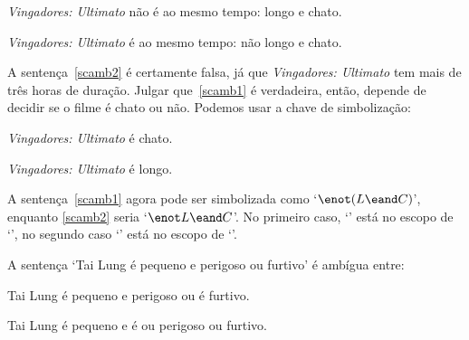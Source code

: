 \begin{earg}
	\item[\ex{scamb1}] \emph{Vingadores: Ultimato} não é ao mesmo tempo: longo e chato.
	\item[\ex{scamb2}] \emph{Vingadores: Ultimato} é ao mesmo tempo: não longo e chato.
\end{earg}

A sentença~\ref{scamb2} é certamente falsa, já que \emph{Vingadores: Ultimato} tem mais de três horas de duração. Julgar que~\ref{scamb1} é verdadeira, então, depende de decidir se o filme é chato ou não. Podemos usar a chave de simbolização: 

\begin{ekey}
	\item[C] \emph{Vingadores: Ultimato} é chato.
	\item[L] \emph{Vingadores: Ultimato} é longo.
\end{ekey}

A sentença~\ref{scamb1} agora pode ser simbolizada como `$\enot(L \eand C)$', enquanto \ref{scamb2} seria `$\enot L \eand C$'. No primeiro caso, `\eand' está no escopo de `\enot', no segundo caso `\enot' está no escopo de `\eand'. 

A sentença `Tai Lung é pequeno e perigoso ou furtivo' é ambígua entre: 

\begin{earg}
	\item[\ex{scamb3}] Tai Lung é pequeno e perigoso ou é furtivo.
	\item[\ex{scamb4}] Tai Lung é pequeno e é ou perigoso ou furtivo.
\end{earg} 

